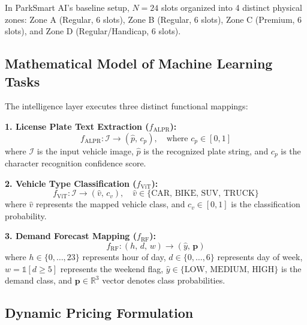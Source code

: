 \documentclass[conference,10pt]{IEEEtran}
\begin{document}
In ParkSmart AI's baseline setup, $N = 24$ slots organized into 4 distinct physical zones: Zone A (Regular, 6 slots), Zone B (Regular, 6 slots), Zone C (Premium, 6 slots), and Zone D (Regular/Handicap, 6 slots).

\subsection{Mathematical Model of Machine Learning Tasks}

The intelligence layer executes three distinct functional mappings:

\textbf{1. License Plate Text Extraction ($f_{\text{ALPR}}$):}
\begin{equation}
f_{\text{ALPR}}: \mathcal{I} \rightarrow (\hat{p},\, c_p), \quad \text{where } c_p \in [0,1]
\end{equation}
where $\mathcal{I}$ is the input vehicle image, $\hat{p}$ is the recognized plate string, and $c_p$ is the character recognition confidence score.

\textbf{2. Vehicle Type Classification ($f_{\text{ViT}}$):}
\begin{equation}
f_{\text{ViT}}: \mathcal{I} \rightarrow (\hat{v},\, c_v), \quad \hat{v} \in \{\text{CAR, BIKE, SUV, TRUCK}\}
\end{equation}
where $\hat{v}$ represents the mapped vehicle class, and $c_v \in [0,1]$ is the classification probability.

\textbf{3. Demand Forecast Mapping ($f_{\text{RF}}$):}
\begin{equation}
f_{\text{RF}}: (h,\, d,\, w) \rightarrow (\hat{y},\, \mathbf{p})
\end{equation}
where $h \in \{0,\ldots,23\}$ represents hour of day, $d \in \{0,\ldots,6\}$ represents day of week, $w = \mathbb{1}[d \geq 5]$ represents the weekend flag, $\hat{y} \in \{\text{LOW, MEDIUM, HIGH}\}$ is the demand class, and $\mathbf{p} \in \mathbb{R}^3$ vector denotes class probabilities.

\subsection{Dynamic Pricing Formulation}
\end{document}
